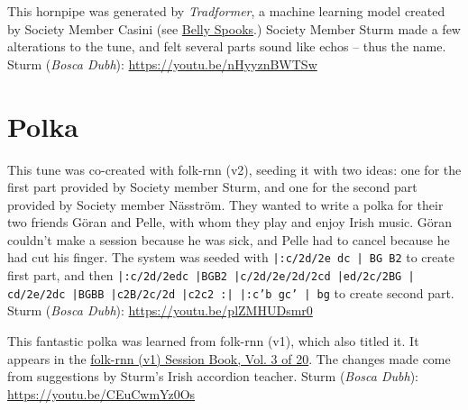 \documentclass[a4paper,notitlepage,twoside]{book}
\begin{document}
{}  
  
\hypertarget{hornpipe:EchoHornpipe}{}
This hornpipe was generated by {\em Tradformer}, 
a machine learning model created by Society Member Casini
(see \hyperlink{hornpipe:BellySpooks}{Belly Spooks}.)
Society Member Sturm made a few alterations to the tune,
and felt several parts sound like echos -- thus the name.
Sturm ({\em Bosca Dubh}): \url{https://youtu.be/nHyyznBWTSw}

\clearpage
\section{Polka}
{}  
 
\hypertarget{polka:GoranPelle}{}
This tune was co-created with folk-rnn (v2), seeding it with two ideas: 
one for the first part provided by Society member Sturm, 
and one for the second part provided by Society member Näsström. 
They wanted to write a polka for their two friends Göran and Pelle, 
with whom they play and enjoy Irish music. 
Göran couldn't make a session because he was sick, 
and Pelle had to cancel because he had cut his finger.
The system was seeded with {\tt |:c/2d/2e dc | BG B2} to create first part,
and then 
{\tt |:c/2d/2edc |BGB2 |c/2d/2e/2d/2cd |ed/2c/2BG | cd/2e/2dc |BGBB |c2B/2c/2d |c2c2 :| |:c'b gc' | bg}
to create second part.
Sturm ({\em Bosca Dubh}): \url{https://youtu.be/plZMHUDsmr0}

{}  
  
\hypertarget{polka:WilliamMurphys}{}
This fantastic polka was learned from folk-rnn (v1), which also titled it.
It appears in the \href{https://highnoongmt.wordpress.com/2018/01/05/volumes-1-20-of-folk-rnn-v1-transcriptions}{folk-rnn (v1) Session Book, Vol. 3 of 20}.
The changes made come from suggestions by Sturm's Irish accordion teacher.
Sturm ({\em Bosca Dubh}): \url{https://youtu.be/CEuCwmYz0Os}
\end{document}
